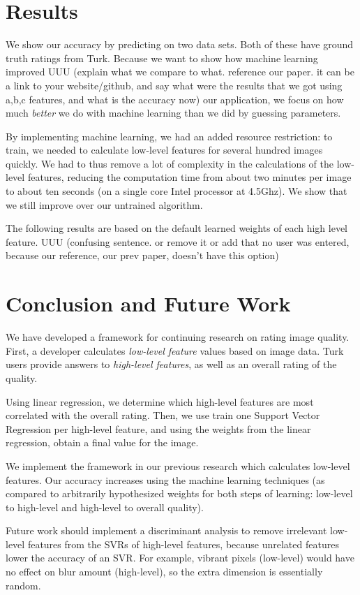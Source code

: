 \documentclass[11pt,letter]{article}
\begin{document}
\section{Results}
We show our accuracy by predicting on two data sets. Both of these have ground truth ratings from Turk. Because we want to show how machine learning improved 
UUU (explain what we compare to what.
reference our paper.
it can be a link to your website/github,
and say what were the results that we 
got using a,b,c features,
and what is the accuracy now)
our application, we focus on how much \textit{better} we do with machine learning than we did by guessing parameters.

By implementing machine learning, we had an added resource restriction: to train, we needed to calculate low-level features for several hundred images quickly. We had to thus remove a lot of complexity in the calculations of the low-level features, reducing the computation time from about two minutes per image to about ten seconds (on a single core Intel processor at 4.5Ghz). We show that we still improve over our untrained algorithm.

The following results are based on the default learned weights of each high level feature.
UUU (confusing sentence. or remove it or add that
no user was entered, because our reference,
our prev paper, doesn't have this option)

\section{Conclusion and Future Work}
We have developed a framework for continuing research on rating image quality. First, a developer calculates \textit{low-level feature} values based on image data. Turk users provide answers to \textit{high-level features}, as well as an overall rating of the quality.

Using linear regression, we determine which high-level features are most correlated with the overall rating. Then, we use train one Support Vector Regression per high-level feature, and using the weights from the linear regression, obtain a final value for the image.

We implement the framework in our previous research which calculates low-level features. Our accuracy increases using the machine learning techniques (as compared to arbitrarily hypothesized weights for both steps of learning: low-level to high-level and high-level to overall quality).

Future work should implement a discriminant analysis to remove irrelevant low-level features from the SVRs of high-level features, because unrelated features lower the accuracy of an SVR. For example, vibrant pixels (low-level) would have no effect on blur amount (high-level), so the extra dimension is essentially random.
\end{document}

